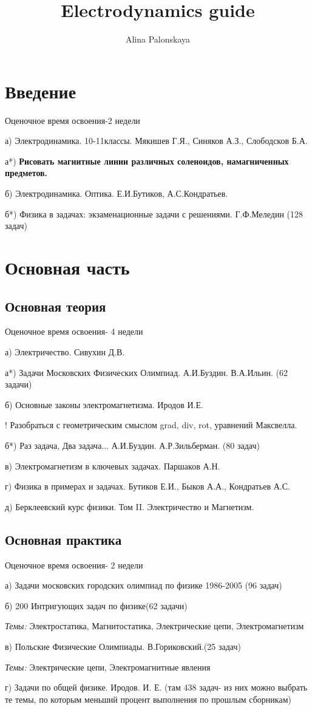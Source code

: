 \documentclass{article}
\title{Electrodynamics guide}
\author{Alina Palonskaya}
\date{}
\begin{document}
\maketitle

\Large\section{Введение}
\large{
Оценочное время освоения-2 недели

а) Электродинамика. 10-11классы. Мякишев Г.Я., Синяков А.З., Слободсков Б.А.

а*) \textbf{Рисовать магнитные линии различных соленоидов, намагниченных предметов.}

б) Электродинамика. Оптика. Е.И.Бутиков, А.С.Кондратьев.

б*) Физика в задачах: экзаменационные задачи с решениями. Г.Ф.Меледин (128 задач)
}

\Large\section{Основная часть}
\large{
\subsection{Основная теория}
Оценочное время освоения- 4 недели

а) Электричество. Сивухин Д.В.

а*) Задачи Московских Физических Олимпиад. А.И.Буздин. В.А.Ильин. (62 задачи)

б) Основные законы электромагнетизма. Иродов И.Е.

! Разобраться с геометрическим смыслом grad, div, rot, уравнений Максвелла.

б*) Раз задача, Два задача... А.И.Буздин. А.Р.Зильберман. (80 задач)

в) Электромагнетизм в ключевых задачах. Паршаков А.Н.

г)  Физика в примерах и задачах. Бутиков Е.И., Быков А.А., Кондратьев А.С.

д) Берклеевский курс физики. Том II. Электричество и Магнетизм.

\subsection{Основная практика}
Оценочное время освоения- 2 недели

а) Задачи московских городских олимпиад по физике 1986-2005 (96 задач)

б) 200 Интригующих задач по физике(62 задачи)

\textit{Темы:} Электростатика, Магнитостатика, Электрические цепи, Электромагнетизм

в) Польские Физические Олимпиады. В.Гориковский.(25 задач)

\textit{Темы:} Электрические цепи, Электромагнитные явления

г) Задачи по общей физике. Иродов. И. Е. (там 438 задач- из них можно выбрать те темы, по которым меньший процент выполнения по прошлым сборникам)
}
\end{document}
